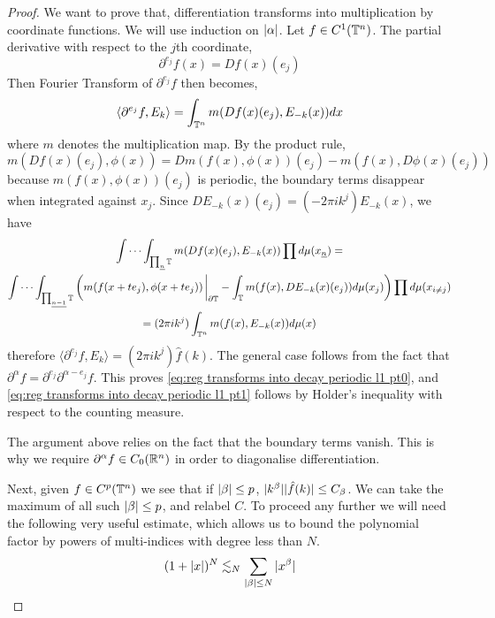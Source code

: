 \documentclass[../main-v2-manifolds.tex]{subfiles}
\begin{document}
\begin{proof}
    We want to prove that, differentiation transforms into multiplication by coordinate functions. We will use induction on $\vert {\alpha} \vert$. Let $f\in C^1({\mathbb{T}^n})$. The partial derivative with respect to the $j$th coordinate,
    \[
        \partial^{e_j}f(x) = Df(x)(e_j)
    \]
    Then Fourier Transform of $\partial^{e_j}f$ then becomes,
    \[
        \langle \partial^{e_j}f,E_k\rangle = \int_{{\mathbb{T}^n}} m(Df(x)(e_j), E_{-k}(x))dx
    \]
    where $m$ denotes the multiplication map. By the product rule,
    \[
        m(Df(x)(e_j), \phi(x)) = Dm(f(x),\phi(x))(e_j) - m(f(x), D\phi(x)(e_j))
    \]
    because $m(f(x), \phi(x))(e_j)$ is periodic, the boundary terms disappear when integrated against $x_j$. Since $D E_{-k}(x)(e_j) = (-2\pi i k^j) E_{-k}(x)$, we have
    \begin{multline}
        \idotsint_{\prod_{\underline{n}}\Torus} m(Df(x)(e_j),E_{-k}(x))\prod d\mu(x_{\underline{n}}) 
        = \\  \idotsint_{\prod_{\underline{n-1}}\Torus} \qty(m(f(x+te_j),\phi(x+te_j))\eval_{\partial\Torus} - \int_\Torus m(f(x), DE_{-k}(x)(e_j)) d\mu(x_j)) \prod d\mu(x_{i\neq j})\\
        =(2\pi i k^j)\int_{\Torusn} m(f(x), E_{-k}(x))d\mu(x)
    \end{multline}
    therefore $\langle \partial^{e_j}f, E_k\rangle = (2\pi i k^j)\hat{f}(k)$. The general case follows from the fact that $\partial^{\alpha}f = \partial^{e_j}\partial^{\alpha-e_j}f$. This proves \cref{eq:reg transforms into decay periodic l1 pt0}, and \cref{eq:reg transforms into decay periodic l1 pt1} follows by Holder's inequality with respect to the counting measure.
    \begin{remark}
        The argument above relies on the fact that the boundary terms vanish. This is why we require $\partial^\alpha f\in C_0({\mathbb{R}^n})$ in order to diagonalise differentiation.
    \end{remark}
    Next, given $f\in C^p({\mathbb{T}^n})$ we see that if $\vert {\beta} \vert\leq p$, $\vert {k^\beta} \vert\vert {\hat{f}(k)} \vert\leq C_{\beta}$. We can take the maximum of all such $\vert {\beta} \vert\leq p$, and relabel $C$. To proceed any further we will need the following very useful estimate, which allows us to bound the polynomial factor by powers of multi-indices with degree less than $N$.
    \begin{equation}
        (1+\vert {x} \vert)^N\lesssim_N \sum_{\vert {\beta} \vert\leq N}\vert {x^\beta} \vert
        \label{eq: reg transinto decay small estimate}
    \end{equation}

\end{proof}
\end{document}
